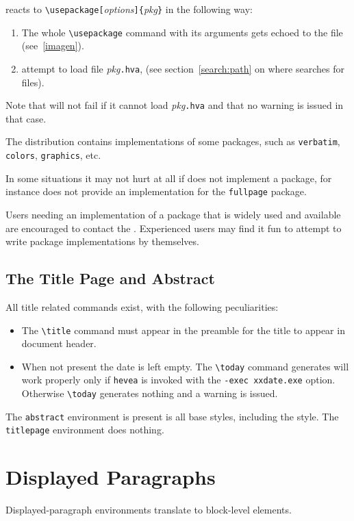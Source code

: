 \hevea{} reacts to
\verb+\usepackage[+\textit{options}\verb+]{+\textit{pkg}\verb+}+ in
the following way:
\begin{enumerate}
\item  The whole
\verb+\usepackage+ command with its arguments gets echoed to the
 file (see~\ref{imagen}).
\item \hevea{} attempt to load file \textit{pkg}\texttt{.hva},
(see section~\ref{search:path} on where \hevea{} searches for files).
\end{enumerate}
Note that \hevea{} will not fail if it cannot load
\textit{pkg}\texttt{.hva} and that no warning is issued in that case.

The \hevea{} distribution contains implementations of some packages,
such as \texttt{verbatim}, \texttt{colors}, \texttt{graphics}, etc.

In some situations it may not hurt at all if \hevea{} does not
implement a package, for instance \hevea{} does not provide an
implementation for the \texttt{fullpage} package.

Users needing an implementation of a package that is widely used and
available are encouraged to contact the
.
Experienced users may find it fun to attempt to write package
implementations by themselves.



\subsection{The Title Page and Abstract}
All title related commands exist, with the following peculiarities:
\begin{itemize}
  \item The \verb+\title+ command must appear in the preamble for the title
to appear in \html{} document header.
  \item When not present the date is left empty. The \verb+\today+
command generates will work properly only if \texttt{hevea} is invoked
with the \verb+-exec xxdate.exe+ option.
Otherwise \verb+\today+ generates nothing and a warning is issued.
\end{itemize}

The \verb+abstract+ environment is present is all base styles,
including the  style.
The \verb+titlepage+ environment does nothing.

\section{Displayed Paragraphs}
Displayed-paragraph environments translate to block-level
elements.

